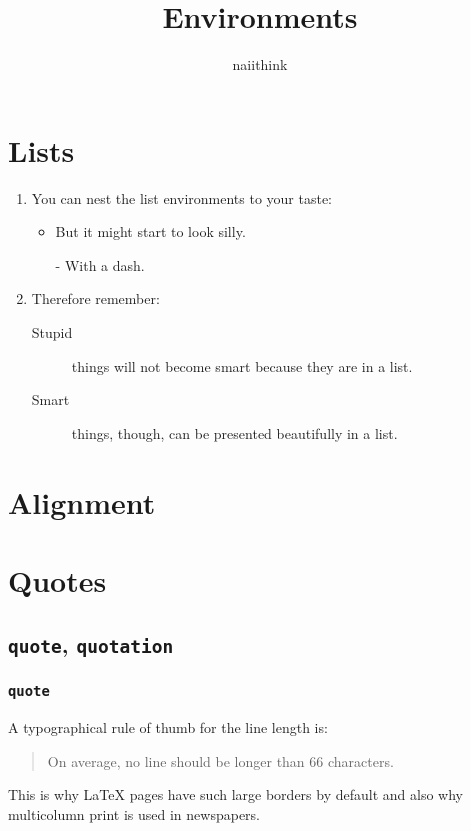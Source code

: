 \documentclass[a4paper]{article}
\title{Environments}
\author{naiithink}
\date{}
\begin{document}
\begin{titlepage}
\maketitle
\thispagestyle{empty}
\tableofcontents
\end{titlepage}

\newpage
\section{Lists}
\flushleft
\begin{enumerate}
\item You can nest the list
environments to your taste:
\begin{itemize}
\item But it might start to
look silly.
\item[-] With a dash.
\end{itemize}
\item Therefore remember:
\begin{description}
\item[Stupid] things will not
become smart because they are
in a list.
\item[Smart] things, though,
can be presented beautifully
in a list.
\end{description}
\end{enumerate}

\newpage
\section{Alignment}
\begin{flushleft}
\blindtext
\end{flushleft}

\begin{center}
\blindtext
\end{center}

\begin{flushright}
\blindtext
\end{flushright}

\newpage
\section{Quotes}

\subsection{\texttt{quote}, \texttt{quotation}}
\subsubsection*{\texttt{quote}}
A typographical rule of thumb
for the line length is:
\begin{quote}
On average, no line should
be longer than 66 characters.
\end{quote}
This is why \LaTeX{} pages have
such large borders by default
and also why multicolumn print
is used in newspapers.
\end{document}
